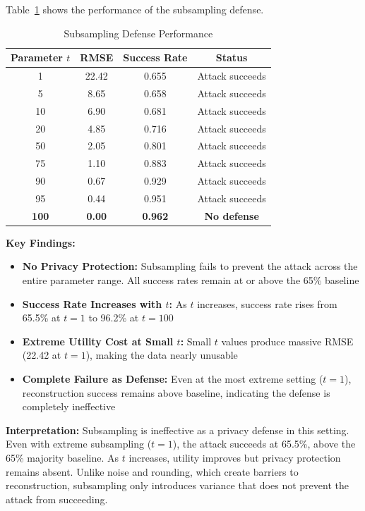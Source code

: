 \documentclass[11pt,letterpaper]{article}
\begin{document}
Table~\ref{tab:subsampling} shows the performance of the subsampling defense.

\begin{table}[H]
\centering
\caption{Subsampling Defense Performance}
\label{tab:subsampling}
\begin{tabular}{@{}cccc@{}}
\toprule
\textbf{Parameter $t$} & \textbf{RMSE} & \textbf{Success Rate} & \textbf{Status} \\ \midrule
1 & 22.42 & 0.655 & Attack succeeds \\
5 & 8.65 & 0.658 & Attack succeeds \\
10 & 6.90 & 0.681 & Attack succeeds \\
20 & 4.85 & 0.716 & Attack succeeds \\
50 & 2.05 & 0.801 & Attack succeeds \\
75 & 1.10 & 0.883 & Attack succeeds \\
90 & 0.67 & 0.929 & Attack succeeds \\
95 & 0.44 & 0.951 & Attack succeeds \\
\textbf{100} & \textbf{0.00} & \textbf{0.962} & \textbf{No defense} \\ \bottomrule
\end{tabular}
\end{table}

\textbf{Key Findings:}

\begin{itemize}[leftmargin=*]
    \item \textbf{No Privacy Protection:} Subsampling fails to prevent the attack across the entire parameter range. All success rates remain at or above the 65\% baseline
    \item \textbf{Success Rate Increases with $t$:} As $t$ increases, success rate rises from 65.5\% at $t=1$ to 96.2\% at $t=100$
    \item \textbf{Extreme Utility Cost at Small $t$:} Small $t$ values produce massive RMSE (22.42 at $t=1$), making the data nearly unusable
    \item \textbf{Complete Failure as Defense:} Even at the most extreme setting ($t=1$), reconstruction success remains above baseline, indicating the defense is completely ineffective
\end{itemize}

\textbf{Interpretation:} Subsampling is ineffective as a privacy defense in this setting. Even with extreme subsampling ($t=1$), the attack succeeds at 65.5\%, above the 65\% majority baseline. As $t$ increases, utility improves but privacy protection remains absent. Unlike noise and rounding, which create barriers to reconstruction, subsampling only introduces variance that does not prevent the attack from succeeding.
\end{document}
